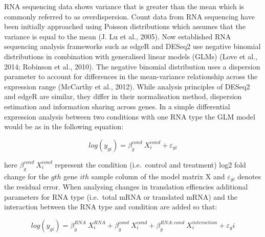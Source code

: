 \documentclass[12pt,openany]{book}
\begin{document}
RNA sequencing data shows variance that is greater than the mean which
is commonly referred to as overdispersion. Count data from RNA
sequencing have been initially approached using Poisson distributions
which assumes that the variance is equal to the mean (J. Lu et al.,
2005). Now established RNA sequencing analysis frameworks such as edgeR
and DESeq2 use negative binomial distributions in combination with
generalised linear models (GLMs) (Love et al., 2014; Robinson et al.,
2010). The negative binomial distribution uses a dispersion parameter to
account for differences in the mean-variance relationship across the
expression range (McCarthy et al., 2012). While analysis principles of
DESeq2 and edgeR are similar, they differ in their normalisation method,
dispersion estimation and information sharing across genes. In a simple
differential expression analysis between two conditions with one RNA
type the GLM model would be as in the following equation:

\[log(y_{gi}) = \beta_g^{cond}\ X_i^{cond} + \varepsilon_{gi}\]

here \(\beta_g^{cond}\ X_i^{cond}\) represent the condition
(i.e.~control and treatment) log2 fold change for the \(gth\) gene
\(ith\) sample column of the model matrix X and \(\varepsilon_{gi}\)
denotes the residual error. When analysing changes in translation
effiencies additional parameters for RNA type (i.e.~total mRNA or
translated mRNA) and the interaction between the RNA type and condition
are added so that:

\[log(y_{gi}) = \beta_g^{RNA}\ X_i^{RNA}+ \beta_g^{cond}\ X_i^{cond} + \beta_g^{RNA:cond}\ X_i^{interaction} + \varepsilon_gi\]
\end{document}

